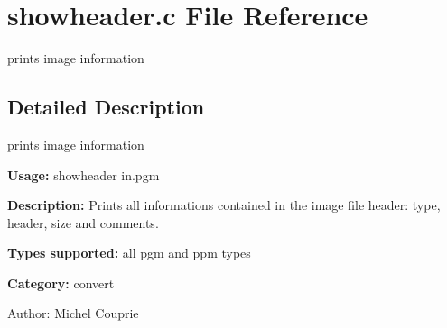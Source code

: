 \section{showheader.c File Reference}
\label{showheader_8c}
prints image information  




\label{_details}
\subsection{Detailed Description}
prints image information 

{\bf Usage:} showheader in.pgm

{\bf Description:} Prints all informations contained in the image file header: type, header, size and comments.

{\bf Types supported:} all pgm and ppm types

{\bf Category:} convert

\begin{Desc}
\item[Author:]Michel Couprie \end{Desc}
